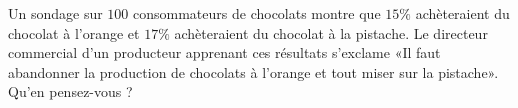 
\begin{exercice}\label{exosmath-0386}

    Un sondage sur \( 100\) consommateurs de chocolats montre que \( 15\%\) achèteraient du chocolat à l'orange et \( 17\%\) achèteraient du chocolat à la pistache. Le directeur commercial d'un producteur apprenant ces résultats s'exclame «Il faut abandonner la production de chocolats à l'orange et tout miser sur la pistache». Qu'en pensez-vous ?

\end{exercice}

